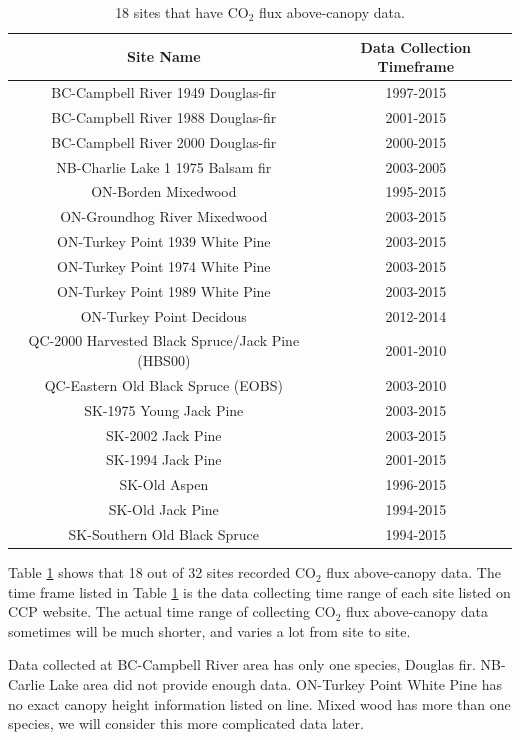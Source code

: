 \documentclass{article}\usepackage[]{graphicx}\usepackage[]{color}
\begin{document}
\begin{table}[!ht]
\centering
\caption{18 sites that have CO$_2$ flux above-canopy data.}
\label{Tab:havedata}
\begin{tabular}{|c|c|}
\hline
Site Name & Data Collection Timeframe  \\
\hline
BC-Campbell River 1949 Douglas-fir & 1997-2015  \\
BC-Campbell River 1988 Douglas-fir & 2001-2015  \\
BC-Campbell River 2000 Douglas-fir & 2000-2015  \\
\hline
NB-Charlie Lake 1 1975 Balsam fir & 2003-2005  \\
\hline
ON-Borden Mixedwood & 1995-2015  \\
ON-Groundhog River Mixedwood & 2003-2015  \\
ON-Turkey Point 1939 White Pine & 2003-2015  \\
ON-Turkey Point 1974 White Pine & 2003-2015  \\
ON-Turkey Point 1989 White Pine & 2003-2015  \\
ON-Turkey Point Decidous & 2012-2014  \\
\hline
QC-2000 Harvested Black Spruce/Jack Pine (HBS00) & 2001-2010 \\
QC-Eastern Old Black Spruce (EOBS) & 2003-2010 \\
\hline
SK-1975 Young Jack Pine & 2003-2015\\
SK-2002 Jack Pine & 2003-2015 \\
SK-1994 Jack Pine & 2001-2015 \\
SK-Old Aspen & 1996-2015 \\
SK-Old Jack Pine &  1994-2015 \\
SK-Southern Old Black Spruce & 1994-2015\\
\hline
\end{tabular}
\end{table}

Table \ref{Tab:havedata} shows that 18 out of 32 sites recorded CO$_2$ flux above-canopy data. 
The time frame listed in Table \ref{Tab:havedata} is the data collecting time range of each site listed on CCP website. The actual time range of collecting CO$_2$ flux above-canopy data sometimes will be much shorter, and varies a lot from site to site. 

Data collected at BC-Campbell River area has only one species, Douglas fir. NB-Carlie Lake area did not provide enough data. ON-Turkey Point White Pine has no exact canopy height information listed on line. Mixed wood has more than one species, we will consider this more complicated data later.
\end{document}
